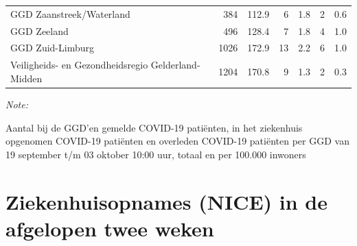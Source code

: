\documentclass[
  english,
  man,floatsintext]{apa6}
\begin{document}
\begin{table}
\begin{threeparttable}
\begin{tabular}{lrrrrrr}
GGD Zaanstreek/Waterland & 384 & 112.9 & 6 & 1.8 & 2 & 0.6\\
GGD Zeeland & 496 & 128.4 & 7 & 1.8 & 4 & 1.0\\
GGD Zuid-Limburg & 1026 & 172.9 & 13 & 2.2 & 6 & 1.0\\
Veiligheids- en Gezondheidsregio Gelderland-Midden & 1204 & 170.8 & 9 & 1.3 & 2 & 0.3\\
\bottomrule
\end{tabular}
\begin{tablenotes}
\item \textit{Note: } 
\item Aantal bij de GGD’en gemelde COVID-19 patiënten, in het ziekenhuis opgenomen COVID-19 patiënten en overleden COVID-19 patiënten per GGD van 19 september t/m 03 oktober 10:00 uur, totaal en per 100.000 inwoners
\end{tablenotes}
\end{threeparttable}
\endgroup{}
\end{table}

\newpage

\hypertarget{ziekenhuisopnames-nice-in-de-afgelopen-twee-weken}{%
\section{Ziekenhuisopnames (NICE) in de afgelopen twee weken}\label{ziekenhuisopnames-nice-in-de-afgelopen-twee-weken}}
\end{document}
